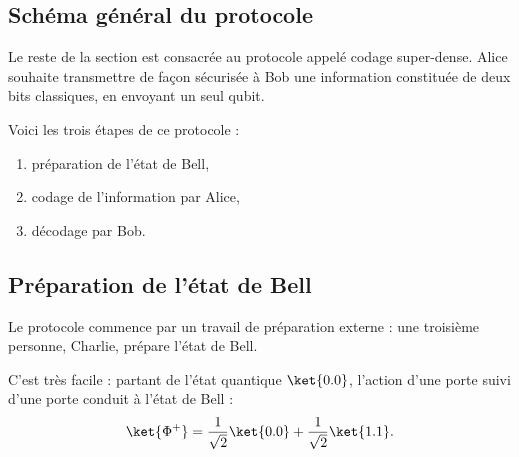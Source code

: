 \documentclass[11pt,class=report,crop=false]{standalone}
\begin{document}
%  
%  
%  



\subsection{Schéma général du protocole}

Le reste de la section est consacrée au protocole appelé \og{}codage super-dense\fg{}.
Alice souhaite transmettre de façon sécurisée à Bob une information constituée de deux bits classiques, en envoyant un seul qubit.

Voici les trois étapes de ce protocole :
\begin{enumerate}
  \item préparation de l'état de Bell,
  \item codage de l'information par Alice,
  \item décodage par Bob.
\end{enumerate}


\subsection{Préparation de l'état de Bell}
Le protocole commence par un travail de préparation externe : une troisième personne, Charlie, prépare l'état de Bell. 

C'est très facile : partant de l'état quantique $\ket{0.0}$, l'action d'une porte  suivi d'une porte  conduit à l'état de Bell :
$$\ket{\Phi^+} = \frac1{\sqrt2} \ket{0.0} + \frac1{\sqrt2} \ket{1.1}.$$
\end{document}
